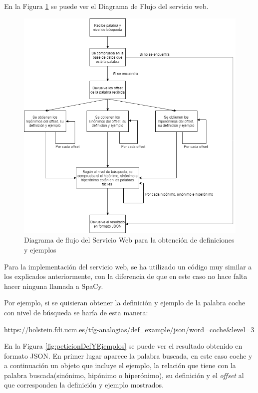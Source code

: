 En la Figura \ref{fig:swdef} se puede ver el Diagrama de Flujo del servicio web.
\begin{figure}[!h]
	\includegraphics[width=.9\textwidth]{Imagenes/Bitmap/Capitulo4/ServiciosWeb/DiagramaFlujoDefinicionYEjemplo.png}
	\centering
	\caption{Diagrama de flujo del Servicio Web para la obtención de definiciones y ejemplos}
	\label{fig:swdef}
\end{figure}

Para la implementación del servicio web, se ha utilizado un código muy similar a los explicados anteriormente, con la diferencia de que en este caso no hace falta hacer ninguna llamada a SpaCy.

Por ejemplo, si se quisieran obtener la definición y ejemplo de la palabra coche con nivel de búsqueda se haría de esta manera:

https://holstein.fdi.ucm.es/tfg-analogias/def\_example/json/word=coche\&level=3

En la Figura \ref{fig:peticionDefYEjemplos} se puede ver el resultado obtenido en formato JSON. En primer lugar aparece la palabra buscada, en este caso coche y a continuación un objeto que incluye el ejemplo, la relación que tiene con la palabra buscada(sinónimo, hipónimo o hiperónimo), su definición y el \textit{offset} al que corresponden la definición y ejemplo mostrados.

